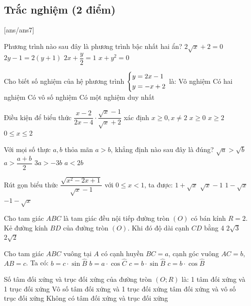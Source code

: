 \setcounter{ex}{0} %
\subsection{Trắc nghiệm (2 điểm)}
[ans/ans7]

\begin{ex}
Phương trình nào sau đây là phương trình bậc nhất hai ẩn?
\choice
{$2\sqrt{x}+2=0$}
{$2y-1=2(y+1)$}
{\True $2x+\dfrac{y}{2}=1$}
{$x+y^2=0$}
\end{ex}

\begin{ex}
Cho biết số nghiệm của hệ phương trình $\left\{\begin{aligned}&y=2x-1\\&y=-x+2\end{aligned}\right.$ là:
\choice
{Vô nghiệm}
{Có hai nghiệm}
{Có vô số nghiệm}
{\True Có một nghiệm duy nhất}
\end{ex}

\begin{ex}
 Điều kiện để biểu thức $\dfrac{x-2}{2x-4}\cdot \dfrac{\sqrt{x}-1}{\sqrt{x}+2}$ xác định
\choice
{\True $x\ge 0, x\ne 2$}
{$x\ge 0$}
{$x\ge 2$}
{$0\le x\le 2$}
\end{ex}

\begin{ex}
 Với mọi số thực $a,b$ thỏa mãn $a > b$, khẳng định nào sau đây là đúng?
\choice
{$\sqrt{a}>\sqrt{b}$}
{\True $a>\dfrac{a+b}{2}$}
{$3a>-3b$}
{$a<2b$}
\end{ex}

\begin{ex}
Rút gọn biểu thức $\dfrac{\sqrt{x^2-2x+1}}{\sqrt{x}-1}$ với $0\le x<1$, ta được:
\choice
{$1+\sqrt{x}$}
{$\sqrt{x}-1$}
{$1-\sqrt{x}$}
{\True $-1-\sqrt{x}$}
\end{ex}

\begin{ex}
 Cho tam giác $ABC$ là tam giác đều nội tiếp đường tròn $(O)$ có bán kính $R = 2$. Kẻ đường kính $BD$ của đường tròn $(O)$. Khi đó độ dài cạnh $CD$ bằng
\choice
{4}
{$2\sqrt{3}$}
{}
{$2\sqrt{2}$}
\end{ex}

\begin{ex}
Cho tam giác $ABC$ vuông tại $A$ có cạnh huyền $BC=a$, cạnh góc vuông $AC=b$, $AB=c$. Ta có:
\choice
{$b=c\cdot\sin\widehat{B}$}
{\True $b=a\cdot\cos\widehat{C}$}
{$c=b\cdot\sin\widehat{B}$}
{$c=b\cdot\cos\widehat{B}$}
\end{ex}

\begin{ex}
Số tâm đối xứng và trục đối xứng của đường tròn $(O;R)$ là:
\choice
{1 tâm đối xứng và 1 trục đối xứng}
{Vô số tâm đối xứng và 1 trục đối xứng}
{ tâm đối xứng và vô số trục đối xứng}
{Không có tâm đối xứng và trục đối xứng}
\end{ex}

